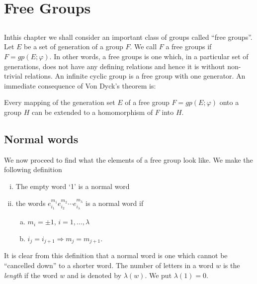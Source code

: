 
\chapter{Free Groups}\label{chap4} %

\section{}\label{chap4:sec1}

In\pageoriginale this chapter we shall consider an important class of groups called ``free
groups''. Let $E$ be a set of generation of a group $F$. We call $F$ a
free groups if $F=gp(E; \varphi)$. In other words, a free groups is
one which, in a particular set of generations, does not have any
defining relations and hence it is without non-trivial relations. An
infinite cyclic group is a free group with one generator. An immediate
consequence of Von Dyck's theorem is: 

\setcounter{theorem}{0}
\begin{theorem}\label{chap4:thm1} %
  Every mapping of the generation set $E$ of a free group $F=gp(E;
  \varphi)$ onto a group $H$ can be extended to a homomorphism of $F$
  into $H$. 
\end{theorem}

\section{Normal words}\label{chap4:sec2} %

We now proceed to find what the elements of a free group look like. We
make the following definition 
\begin{defi*}
  \begin{enumerate}[(i)]
  \item The empty word `1' is a normal word
  \item the words $e^{m_1}_{i_1}e^{m_2}_{i_2}\cdots e^{m_ \lambda}_{i_
    \lambda}$ is a normal word if 
    \begin{enumerate}[(a)]
    \item $m_i= \pm 1$, $i=1, \ldots, \lambda$
    \item $i_j=i_{j+1}\Rightarrow m_j=m_{j+1}$.
    \end{enumerate}
  \end{enumerate}
\end{defi*}

It is clear from this definition that a normal word is one which
cannot be ``cancelled down'' to a shorter word. The number of
letters\pageoriginale 
in a word $w$ is the \textit{length} if the word $w$ and is denoted by
$\lambda(w)$. We put $\lambda(1)=0$. 

